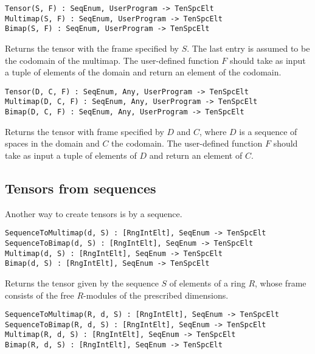\documentclass{amsart}
\begin{document}
\color{blue}
{\small \begin{verbatim}
Tensor(S, F) : SeqEnum, UserProgram -> TenSpcElt
Multimap(S, F) : SeqEnum, UserProgram -> TenSpcElt
Bimap(S, F) : SeqEnum, UserProgram -> TenSpcElt
\end{verbatim} }
\color{black}

Returns the tensor with the frame specified by $S$. The last entry is assumed to
be the codomain of the multimap. The user-defined function $F$ should take as
input a tuple of elements of the domain and return an element of the codomain.

\color{blue}
{\small \begin{verbatim}
Tensor(D, C, F) : SeqEnum, Any, UserProgram -> TenSpcElt
Multimap(D, C, F) : SeqEnum, Any, UserProgram -> TenSpcElt
Bimap(D, C, F) : SeqEnum, Any, UserProgram -> TenSpcElt
\end{verbatim} }
\color{black}

Returns the tensor with frame specified by $D$ and $C$, where $D$ is a sequence 
of spaces in the domain and $C$ the codomain. The user-defined function $F$ 
should take as input a tuple of elements of $D$ and return an element of $C$.

\subsection{Tensors from sequences}
Another way to create tensors is by a sequence.

\color{blue}
{\small \begin{verbatim}
SequenceToMultimap(d, S) : [RngIntElt], SeqEnum -> TenSpcElt
SequenceToBimap(d, S) : [RngIntElt], SeqEnum -> TenSpcElt
Multimap(d, S) : [RngIntElt], SeqEnum -> TenSpcElt
Bimap(d, S) : [RngIntElt], SeqEnum -> TenSpcElt
\end{verbatim} }
\color{black}

Returns the tensor given by the sequence $S$ of elements of a ring $R$, whose 
frame consists of the free $R$-modules of the prescribed dimensions. 

\color{blue}
{\small \begin{verbatim}
SequenceToMultimap(R, d, S) : [RngIntElt], SeqEnum -> TenSpcElt
SequenceToBimap(R, d, S) : [RngIntElt], SeqEnum -> TenSpcElt
Multimap(R, d, S) : [RngIntElt], SeqEnum -> TenSpcElt
Bimap(R, d, S) : [RngIntElt], SeqEnum -> TenSpcElt
\end{verbatim} }
\color{black}
\end{document}
